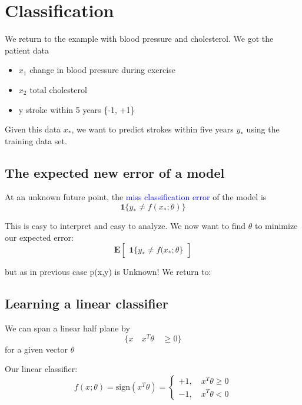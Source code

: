 
\section{Classification}


We return to the example with blood pressure and cholesterol. We got the patient data 
\begin{itemize}
	\item $x_1$ change in blood pressure during exercise
	\item $x_2$ total cholesterol
	\item y stroke within 5 years \{-1, +1\}
\end{itemize}

Given this data \textbf{$x_*$}, we want to predict strokes within five years \textbf{$y_*$} using the training data set. 

\subsection*{The expected new error of a model}
At an unknown future point, the \textcolor{blue}{miss classification error} of the model is 
\begin{equation}
\textbf{1}\{y_* \neq f(x_* ; \theta) \}
\end{equation}

This is easy to interpret and easy to analyze. We now want to find $\theta$ to minimize our expected error:
\begin{equation}
\textbf{E}\begin{bmatrix} \textbf{1}\{ y_* \neq f(x_*; \theta\} \end{bmatrix}
\end{equation}

but as in previous case p(x,y) is Unknown! We return to:

\subsection*{Learning a linear classifier}
We can span a linear half plane by
\begin{equation}
\{ x \quad x^{T}\theta \quad \ge 0  \}
\end{equation}
for a given vector $\theta$

Our linear classifier:
\begin{equation}
f(x;\theta) = \text{sign}(x^{T}\theta) = \begin{cases} +1, \quad x^{T}\theta \ge 0 \\ -1, \quad x^{T} \theta < 0\end{cases}
\end{equation}

